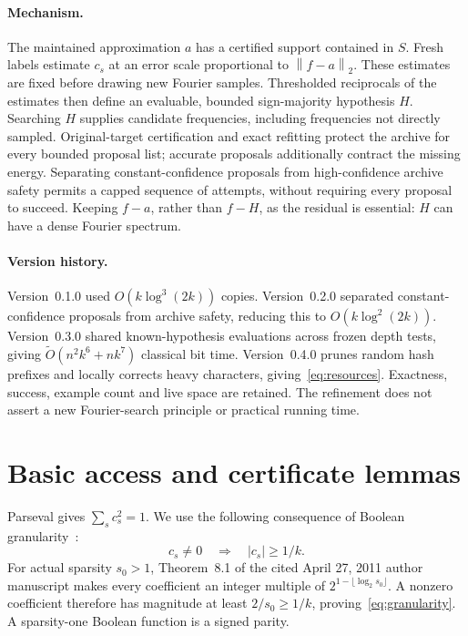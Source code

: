 \documentclass[11pt]{article}
\theoremstyle{remark}\newtheorem{remark}[theorem]{Remark}
\newcommand{\norm}[1]{\left\|#1\right\|}
\begin{document}
\paragraph{Mechanism.}
The maintained approximation $a$ has a certified support contained in $S$. Fresh labels estimate $c_s$ at an error scale proportional to $\norm{f-a}_2$. These estimates are fixed before drawing new Fourier samples. Thresholded reciprocals of the estimates then define an evaluable, bounded sign-majority hypothesis $H$. Searching $H$ supplies candidate frequencies, including frequencies not directly sampled. Original-target certification and exact refitting protect the archive for every bounded proposal list; accurate proposals additionally contract the missing energy. Separating constant-confidence proposals from high-confidence archive safety permits a capped sequence of attempts, without requiring every proposal to succeed. Keeping $f-a$, rather than $f-H$, as the residual is essential: $H$ can have a dense Fourier spectrum.

\paragraph{Version history.}
Version~0.1.0 used $O(k\log^3(2k))$ copies. Version~0.2.0 separated constant-confidence proposals from archive safety, reducing this to $O(k\log^2(2k))$. Version~0.3.0 shared known-hypothesis evaluations across frozen depth tests, giving $\widetilde O(n^2k^6+nk^7)$ classical bit time. Version~0.4.0 prunes random hash prefixes and locally corrects heavy characters, giving~\eqref{eq:resources}. Exactness, success, example count and live space are retained. The refinement does not assert a new Fourier-search principle or practical running time.

\section{Basic access and certificate lemmas}
Parseval gives $\sum_s c_s^2=1$. We use the following consequence of Boolean granularity~\cite[Theorem~8.1]{GOSSW}:
\begin{equation}\label{eq:granularity}
 c_s\ne0\quad\Longrightarrow\quad |c_s|\ge1/k.
\end{equation}
For actual sparsity $s_0>1$, Theorem~8.1 of the cited April 27, 2011 author manuscript makes every coefficient an integer multiple of $2^{1-\lfloor\log_2 s_0\rfloor}$. A nonzero coefficient therefore has magnitude at least $2/s_0\ge1/k$, proving~\eqref{eq:granularity}. A sparsity-one Boolean function is a signed parity.
\end{document}
